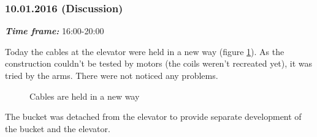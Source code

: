 \subsubsection{10.01.2016 (Discussion)}
\textit{\textbf{Time frame:}} 16:00-20:00 

Today the cables at the elevator were held in a new way (figure \ref{Elevator3.3}). As the construction couldn't be tested by motors (the coils weren't recreated yet), it was tried by the arms. There were not noticed any problems.

\begin{figure}[H]
	\begin{minipage}[h]{1\linewidth}
		\caption{Cables are held in a new way}
		\label{Elevator3.3}
	\end{minipage}
\end{figure}

The bucket was detached from the elevator to provide separate development of the bucket and the elevator.